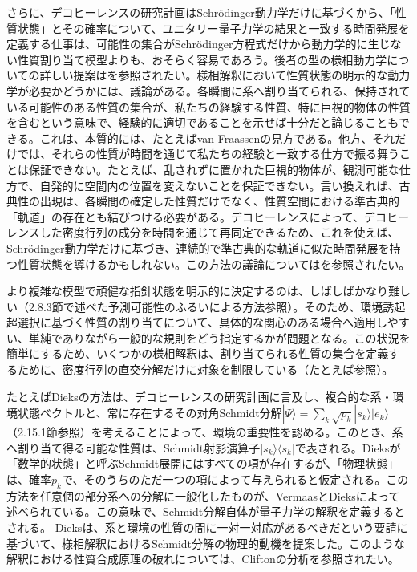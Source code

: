 \hypertarget{srcpage:346}{}\label{srcpage:346}
さらに、デコヒーレンスの研究計画はSchrödinger動力学だけに基づくから、「性質状態」とその確率について、ユニタリー量子力学の結果と一致する時間発展を定義する仕事は、可能性の集合がSchrödinger方程式だけから動力学的に生じない性質割り当て模型よりも、おそらく容易であろう。後者の型の様相動力学についての詳しい提案は\cite{ref432}を参照されたい。様相解釈において性質状態の明示的な動力学が必要かどうかには、議論がある。各瞬間に系へ割り当てられる、保持されている可能性のある性質の集合が、私たちの経験する性質、特に巨視的物体の性質を含むという意味で、経験的に適切であることを示せば十分だと論じることもできる。これは、本質的には、たとえばvan Fraassen\cite{ref427,ref428}の見方である。他方、それだけでは、それらの性質が時間を通じて私たちの経験と一致する仕方で振る舞うことは保証できない。たとえば、乱されずに置かれた巨視的物体が、観測可能な仕方で、自発的に空間内の位置を変えないことを保証できない。言い換えれば、古典性の出現は、各瞬間の確定した性質だけでなく、性質空間における準古典的「軌道」の存在とも結びつける必要がある。デコヒーレンスによって、デコヒーレンスした密度行列の成分を時間を通じて再同定できるため、これを使えば、Schrödinger動力学だけに基づき、連続的で準古典的な軌道に似た時間発展を持つ性質状態を導けるかもしれない。この方法の議論については\cite{ref432,ref433}を参照されたい。

より複雑な模型で頑健な指針状態を明示的に決定するのは、しばしばかなり難しい（2.8.3節で述べた予測可能性のふるいによる方法参照）。そのため、環境誘起超選択に基づく性質の割り当てについて、具体的な関心のある場合へ適用しやすい、単純でありながら一般的な規則をどう指定するかが問題となる。この状況を簡単にするため、いくつかの様相解釈は、割り当てられる性質の集合を定義するために、密度行列の直交分解だけに対象を制限している（たとえば\cite{ref068,ref434,ref435,ref436,ref437}参照）。

たとえばDieks\cite{ref436}の方法は、デコヒーレンスの研究計画に言及し、複合的な系・環境状態ベクトルと、常に存在するその対角Schmidt分解$|\Psi\rangle=\sum_k\sqrt{p_k}|s_k\rangle|e_k\rangle$（2.15.1節参照）を考えることによって、環境の重要性を認める。このとき、系へ割り当て得る可能な性質は、Schmidt射影演算子$|s_k\rangle\langle s_k|$で表される。Dieksが「数学的状態」と呼ぶSchmidt展開にはすべての項が存在するが、「物理状態」は、確率$p_k$で、そのうちのただ一つの項によって与えられると仮定される。この方法を任意個の部分系への分解に一般化したものが、VermaasとDieks\cite{ref437}によって述べられている。この意味で、Schmidt分解自体が量子力学の解釈を定義するとされる。
\hypertarget{srcpage:347}{}\label{srcpage:347}
Dieks\cite{ref438}は、系と環境の性質の間に一対一対応があるべきだという要請に基づいて、様相解釈におけるSchmidt分解の物理的動機を提案した。このような解釈における性質合成原理の破れについては、Cliftonの分析\cite{ref429}を参照されたい。

